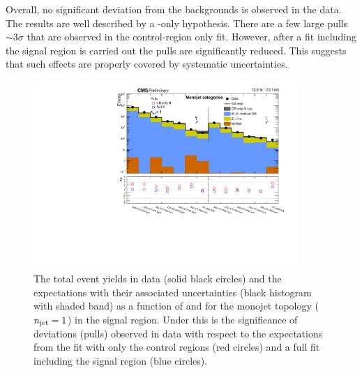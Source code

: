 Overall, no significant deviation from the \SM backgrounds is observed
in the data. The results are well described by a \SM-only hypothesis.
There are a few large pulls $\sim 3\sigma$ that are observed in the
control-region only fit. However, after a fit including the signal
region is carried out the pulls are significantly reduced. This
suggests that such effects are properly covered by systematic
uncertainties.

\begin{figure}[!h]
  \begin{center}
    \includegraphics[width=0.9\textwidth]{figs/analysis/results/summaryPlot_Monojet_prefit_overlay_fit_b}
    \caption{The total event yields in data (solid black circles)
      and the \SM expectations with their associated uncertainties (black
      histogram with shaded band) as a function of
      \nb and \HT for the monojet topology ($n_{\text{jet}} = 1$) in the
      signal region. Under this is the significance of deviations
      (pulls) observed in data with respect to the \SM expectations
      from the fit with only the control regions (red circles) and a
      full fit including the signal region (blue circles).}
    \label{fig:mono}
  \end{center}
\end{figure}


